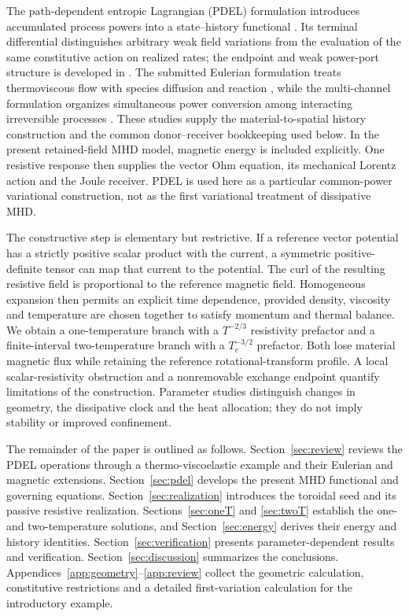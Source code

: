 \documentclass[11pt,a4paper]{article}
\theoremstyle{remark}\newtheorem{remark}{Remark}
\numberwithin{equation}{section}
\begin{document}
The path-dependent entropic Lagrangian (PDEL) formulation introduces accumulated process powers into a state--history functional \citep{RenEntropy,Ren}. Its terminal differential distinguishes arbitrary weak field variations from the evaluation of the same constitutive action on realized rates; the endpoint and weak power-port structure is developed in \citet{RenSpending}. The submitted Eulerian formulation treats thermoviscous flow with species diffusion and reaction \citep{RenEulerian}, while the multi-channel formulation organizes simultaneous power conversion among interacting irreversible processes \citep{RenMultiChannel}. These studies supply the material-to-spatial history construction and the common donor--receiver bookkeeping used below. In the present retained-field MHD model, magnetic energy is included explicitly. One resistive response then supplies the vector Ohm equation, its mechanical Lorentz action and the Joule receiver. PDEL is used here as a particular common-power variational construction, not as the first variational treatment of dissipative MHD.

The constructive step is elementary but restrictive. If a reference vector potential has a strictly positive scalar product with the current, a symmetric positive-definite tensor can map that current to the potential. The curl of the resulting resistive field is proportional to the reference magnetic field. Homogeneous expansion then permits an explicit time dependence, provided density, viscosity and temperature are chosen together to satisfy momentum and thermal balance. We obtain a one-temperature branch with a $T^{-2/3}$ resistivity prefactor and a finite-interval two-temperature branch with a $T_e^{-3/2}$ prefactor. Both lose material magnetic flux while retaining the reference rotational-transform profile. A local scalar-resistivity obstruction and a nonremovable exchange endpoint quantify limitations of the construction. Parameter studies distinguish changes in geometry, the dissipative clock and the heat allocation; they do not imply stability or improved confinement.

The remainder of the paper is outlined as follows. Section~\ref{sec:review} reviews the PDEL operations through a thermo-viscoelastic example and their Eulerian and magnetic extensions. Section~\ref{sec:pdel} develops the present MHD functional and governing equations. Section~\ref{sec:realization} introduces the toroidal seed and its passive resistive realization. Sections~\ref{sec:oneT} and \ref{sec:twoT} establish the one- and two-temperature solutions, and Section~\ref{sec:energy} derives their energy and history identities. Section~\ref{sec:verification} presents parameter-dependent results and verification. Section~\ref{sec:discussion} summarizes the conclusions. Appendices~\ref{app:geometry}--\ref{app:review} collect the geometric calculation, constitutive restrictions and a detailed first-variation calculation for the introductory example.
\end{document}
